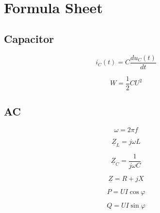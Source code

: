 \documentclass[a4paper,12pt]{article}
\begin{document}
\newpage

\section*{Formula Sheet}

\subsection*{Capacitor}

\[
i_C(t) = C \frac{du_C(t)}{dt}
\]

\[
W = \frac{1}{2} C U^2
\]

\subsection*{AC}

\[
\omega = 2 \pi f
\]

\[
\underline{Z}_L = j \omega L
\]

\[
\underline{Z}_C = \frac{1}{j \omega C}
\]

\[
\underline{Z} = R + jX
\]

\[
P = U I \cos \varphi
\]

\[
Q = U I \sin \varphi
\]
\end{document}

